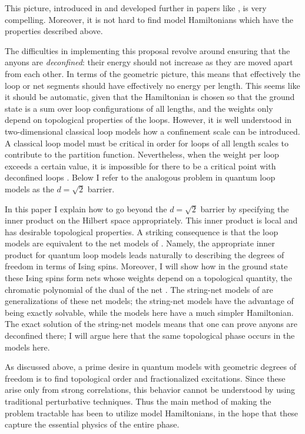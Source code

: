\documentclass[11pt]{article}
\begin{document}
This picture, introduced in \cite{Kitaev97,MS,Freedman01} and developed
further in papers like \cite{FNS,FF,Fidkowski}, is very
compelling. Moreover, it is not hard to find model Hamiltonians which
have the properties described above. 

The difficulties in implementing this proposal revolve around ensuring
that the anyons are {\em deconfined}: their energy should not increase
as they are moved apart from each other. In terms of the geometric
picture, this means that effectively the loop or net segments should
have effectively no energy per length. This seems like it should be
automatic, given that the Hamiltonian is chosen so that the ground
state is a sum over loop configurations of all lengths, and the
weights only depend on topological properties of the loops. However,
it is well understood in two-dimensional classical loop models how a
confinement scale can be introduced. A classical loop model must be
critical in order for loops of all length scales to contribute to the
partition function. Nevertheless, when the weight per loop exceeds a
certain value, it is impossible for there to be a critical point with
deconfined loops \cite{Nienhuis}. Below I refer to the analogous
problem in quantum loop models as the $d=\sqrt{2}$ barrier.


In this paper I explain how to go beyond the $d=\sqrt{2}$ barrier by
specifying the inner product on the Hilbert space appropriately.  This
inner product is local and has desirable topological properties.  A
striking consequence is that the loop models are
equivalent to the net models of \cite{FF}. Namely, the appropriate
inner product for quantum loop models leads naturally to describing
the degrees of freedom in terms of Ising spins. Moreover, I will show
how in the ground state these Ising spins form nets whose weights
depend on a topological quantity, the chromatic polynomial of the dual
of the net \cite{FF}.  The string-net models of
\cite{LevinWen,Fidkowski} are generalizations of these net models; the
string-net models have the advantage of being exactly solvable, while
the models here have a much simpler Hamiltonian. The exact solution of
the string-net models means that one can prove anyons are deconfined
there; I will argue here that the same topological phase occurs in
the models here.

As discussed above, a prime desire in quantum models with geometric
degrees of freedom is to find
topological order and fractionalized excitations. Since 
these arise only from strong correlations, this behavior
cannot be understood by using traditional perturbative
techniques. Thus the main method of making the problem tractable has
been to utilize model Hamiltonians, in the hope that these capture the
essential physics of the entire phase.
\end{document}

